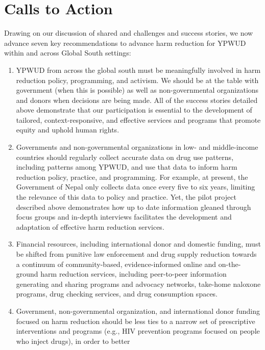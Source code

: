 \documentclass[
  letterpaper,
  DIV=11,
  numbers=noendperiod]{scrartcl}
\providecommand{\tightlist}{%
  \setlength{\itemsep}{0pt}\setlength{\parskip}{0pt}}\usepackage{longtable,booktabs,array}
\begin{document}
\section{Calls to Action}\label{calls-to-action}

Drawing on our discussion of shared and challenges and success stories,
we now advance seven key recommendations to advance harm reduction for
YPWUD within and across Global South settings:

\begin{enumerate}
\def\labelenumi{\arabic{enumi}.}
\tightlist
\item
  YPWUD from across the global south must be meaningfully involved in
  harm reduction policy, programming, and activism. We should be at the
  table with government (when this is possible) as well as
  non-governmental organizations and donors when decisions are being
  made. All of the success stories detailed above demonstrate that our
  participation is essential to the development of tailored,
  context-responsive, and effective services and programs that promote
  equity and uphold human rights.
\item
  Governments and non-governmental organizations in low- and
  middle-income countries should regularly collect accurate data on drug
  use patterns, including patterns among YPWUD, and use that data to
  inform harm reduction policy, practice, and programming. For example,
  at present, the Government of Nepal only collects data once every five
  to six years, limiting the relevance of this data to policy and
  practice. Yet, the pilot project described above demonstrates how up
  to date information gleaned through focus groups and in-depth
  interviews facilitates the development and adaptation of effective
  harm reduction services.
\item
  Financial resources, including international donor and domestic
  funding, must be shifted from punitive law enforcement and drug supply
  reduction towards a continuum of community-based, evidence-informed
  online and on-the-ground harm reduction services, including
  peer-to-peer information generating and sharing programs and advocacy
  networks, take-home naloxone programs, drug checking services, and
  drug consumption spaces.
\item
  Government, non-governmental organization, and international donor
  funding focused on harm reduction should be less ties to a narrow set
  of prescriptive interventions and programs (e.g., HIV prevention
  programs focused on people who inject drugs), in order to better

\end{enumerate}
\end{document}
